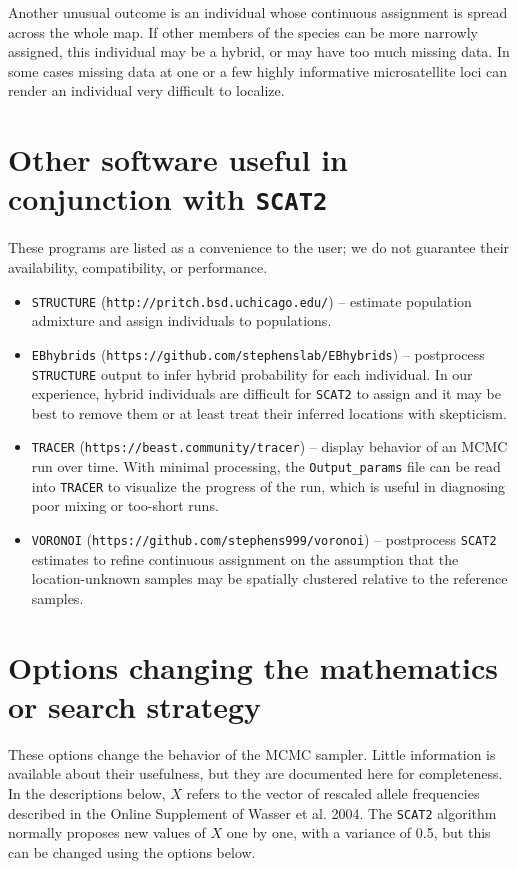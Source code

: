 \documentclass[10pt,titlepage,times,letterpaper]{article}
\def\SCAT{{\tt SCAT2} }
\begin{document}
Another unusual outcome is an individual whose continuous assignment is
spread across the whole map.  If other members of the species can be more
narrowly assigned, this individual may be a hybrid, or may have too much
missing data.  In some cases missing data at one or a few highly informative
microsatellite loci can render an individual very difficult to localize.

\section{Other software useful in conjunction with \SCAT} \label{software}

These programs are listed as a convenience to the user; we do not
guarantee their availability, compatibility, or performance.

\begin{itemize}
\item {\tt STRUCTURE} ({\tt http://pritch.bsd.uchicago.edu/}) -- estimate
population admixture and assign individuals to populations.
\item {\tt EBhybrids} ({\tt https://github.com/stephenslab/EBhybrids}) -- 
postprocess {\tt STRUCTURE} output to infer hybrid probability for each 
individual.  In our experience, hybrid individuals are difficult for \SCAT 
to assign and it may be best to remove them or at least treat their
inferred locations with skepticism.
\item {\tt TRACER} ({\tt https://beast.community/tracer}) -- display behavior
of an MCMC run over time.  With minimal processing, the {\tt Output\_params}
file can be read into {\tt TRACER} to visualize the progress of the run,
which is useful in diagnosing poor mixing or too-short runs.
\item {\tt VORONOI} ({\tt https://github.com/stephens999/voronoi}) --
postprocess \SCAT estimates to refine continuous assignment on the
assumption that the location-unknown samples may be spatially clustered
relative to the reference samples.
\end{itemize}

\section{Options changing the mathematics or search strategy}

These options change the behavior of the MCMC sampler.  Little information
is available about their usefulness, but they
are documented here for completeness.  In the descriptions below, $X$ refers
to the vector of rescaled allele frequencies described in the
Online Supplement of Wasser et al. 2004.  The \SCAT algorithm normally
proposes new values of $X$ one by one, with a variance of 0.5, but
this can be changed using the options below.
\end{document}
